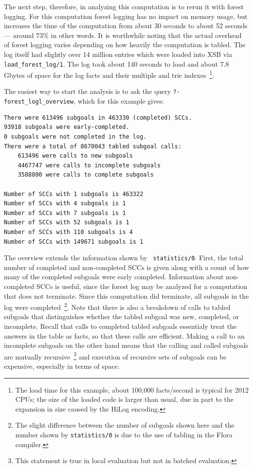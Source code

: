 \begin{example}
The next step, therefore, in analyzing this computation is to rerun it
with forest logging.  For this computation forest logging has no
impact on memory usage, but increases the time of the computation from
about 30 seconds to about 52 seconds --- around 73\% in other words.
It is worthwhile noting that the actual overhead of forest logging
varies depending on how heavily the computation is tabled.  The log
itself had slightly over 14 million entries which were loaded into XSB
via {\tt load\_forest\_log/1}.  The log took about 140 seconds to load
and about 7.8 Gbytes of space for the log facts and their multiple and
trie indexes~\footnote{The load time for this example, about 100,000
  facts/second is typical for 2012 CPUs; the size of the loaded code
  is larger than usual, due in part to the expansion in size caused by
  the HiLog encoding.}.

The easiest way to start the analysis is to ask the query {\tt ?-
  forest\_logl\_overview}, which for this example gives:
%
\begin{verbatim}
There were 613496 subgoals in 463330 (completed) SCCs.  
93918 subgoals were early-completed.  
0 subgoals were not completed in the log.
There were a total of 8670043 tabled subgoal calls:
    613496 were calls to new subgoals
    4467747 were calls to incomplete subgoals
    3588800 were calls to complete subgoals

Number of SCCs with 1 subgoals is 463322
Number of SCCs with 4 subgoals is 1
Number of SCCs with 7 subgoals is 1
Number of SCCs with 52 subgoals is 1
Number of SCCs with 110 subgoals is 4
Number of SCCs with 149671 subgoals is 1
\end{verbatim}
%
%
The overview extends the information shown by {\tt
  statistics/0}.  First, the total number of completed and
non-completed SCCs is given along with a count of how many of the
completed subgoals were early completed.  Information about
non-completed SCCs is useful, since the forest log may be analyzed for
a computation that does not terminate.  Since this computation did
terminate, all subgoals in the log were completed~\footnote{The slight
  difference between the number of subgoals shown here and the number
  shown by {\tt statistics/0} is due to the use of tabling in the
  Flora compiler.}.  Note that there is also a breakdown of calls to
tabled subgoals that distinguishes whether the tabled subgoal was new,
completed, or incomplete.  Recall that calls to completed tabled
subgoals essentialy treat the answers in the table as facts, so that
these calls are efficient.  Making a call to an incomplete subgoals on
the other hand means that the calling and called subgoals are mutually
recursive~\footnote{This statement is true in local evaluation but not
  in batched evaluation.} and execution of recursive sets of subgoals
can be expensive, especially in terms of space.


\end{example}
